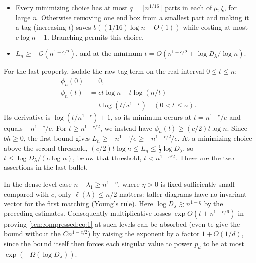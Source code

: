 \begin{itemize}
To bound $h(v)$, write \(\ell=v_1,\ s=n-\ell\).
If $s=0$, then $h(v)=0$.
The hook product on the first removed line is at most
\(\ell!\exp(s)\), by adding the \(s\) excess lengths; on every
later one it is at most \((2v_i)^{v_i}\). Stirling or factorial
estimates thus give \(\log D_\lambda\ge h(v)-O(s)\) (the ratio
\(n!/\ell!\) has log at least
\(n\log n-\ell\log\ell-O(s)\)). Also
\(\log D_\lambda=\Omega(s)\) for growing \(n\): if \(\ell\)
is a sufficiently small fraction of \(n\) this follows directly;
otherwise keep the first line and a subdiagram below (or beside)
it of size \(u=\min(s,\lfloor\ell/3\rfloor)\); interleavings of
its fixed tableau with the line respecting the two-list ballot
condition already give exponentially many in \(s\). Bounded
small sizes can equivalently be handled separately. Hence
$h(v)\le C_0\log D_\lambda$ uniformly for an absolute $C_0$, and fixing
$b\le1/(2C_0)$ proves the claimed budget bound.
\item Every minimizing choice has at most \(q=\lceil n^{1/16}\rceil\) parts in each of \(\mu,\xi\), for large \(n\). Otherwise removing one end box from a smallest part and making it a tag (increasing \(t\)) saves \(b((1/16)\log n-O(1))\) while costing at most \(c\log n+1\). Branching permits this choice.
\item \(L_n\ge -O(n^{1-c/2})\), and at the minimum \(t=O(n^{1-c/2}+\log D_\lambda/\log n)\).
\end{itemize}

For the last property, isolate the raw tag term on the real interval \(0\le t\le n\):
\[
 \begin{aligned}
 \phi_n(0)&=0,\\
 \phi_n(t)&=ct\log n-t\log(n/t)\\
          &=t\log(t/n^{1-c})\quad(0<t\le n).
 \end{aligned}
\]
Its derivative is \(\log(t/n^{1-c})+1\), so its minimum occurs at
\(t=n^{1-c}/e\) and equals \(-n^{1-c}/e\). For
\(t\ge n^{1-c/2}\), we instead have
\(\phi_n(t)\ge(c/2)t\log n\). Since \(bh\ge0\), the first bound gives
\(L_n\ge-n^{1-c}/e\ge-n^{1-c/2}/e\). At a minimizing choice above the
second threshold,
\((c/2)t\log n\le L_n\le\frac12\log D_\lambda\), so
\(t\le\log D_\lambda/(c\log n)\); below that threshold,
\(t<n^{1-c/2}\). These are the two assertions in the last bullet.



In the dense-level case \(n-\lambda_1\ge n^{1-\eta}\), where \(\eta>0\) is fixed sufficiently small compared with \(c\), only \(\ell(\lambda)\le n/2\) matters: taller diagrams have no invariant vector for the first matching (Young's rule). Here \(\log D_\lambda\gtrsim n^{1-\eta}\) by the preceding estimates. Consequently multiplicative losses \(\exp O(t+n^{1-c/6})\) in proving \eqref{ten:compressed:eq:1} at such levels can be absorbed (even to give the bound without the \(C n^{1-c/2}\)) by raising the exponent by a factor \(1+O(1/d)\), since the bound itself then forces each singular value to power \(p_d\) to be at most \(\exp(-\Omega(\log D_\lambda))\).

